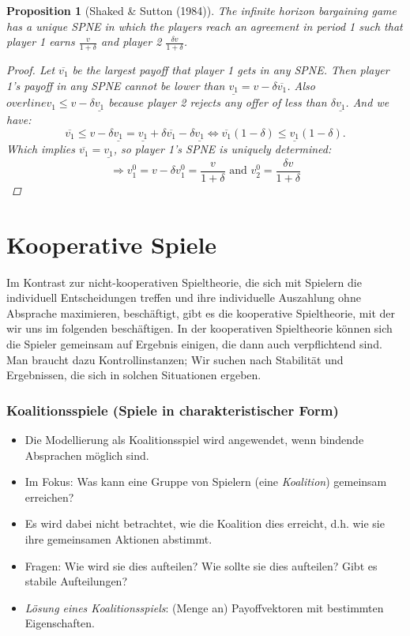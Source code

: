 \documentclass[12pt]{extreport} %
\theoremstyle{named}
\theoremstyle{itshape}
\theoremstyle{normal}
\newtheorem{proposition}[unnamedtheorem]{Proposition}
\begin{document}
\begin{proposition}[Shaked \& Sutton (1984)]
	The infinite horizon bargaining game has a unique SPNE in which the players reach an agreement in period 1 such that player 1 earns $\frac{v}{1 + \delta}$ and player 2 $\frac{\delta v}{1 + \delta}$.
	
	\begin{proof}
		Let $\overline{v_1}$ be the largest payoff that player 1 gets in any SPNE. Then player 1's payoff in any SPNE cannot be lower than $\underline{v_1} = v - \delta \overline{v_1}$. Also $overline{v_1} \leq v - \delta \underline{v_1}$ because player 2 rejects any offer of less than $\delta \underline{v_1}$. And we have:
		$$ \overline{v_1} \leq v - \delta \underline{v_1} = \underline{v_1} + \delta \overline{v_1} - \delta \underline{v_1} \iff \overline{v_1} (1 - \delta) \leq \underline{v_1} (1 - \delta). $$
		Which implies $\overline{v_1} = \underline{v_1}$, so player 1's SPNE is uniquely determined:
		$$ \Rightarrow v_1^0 = v - \delta v_1^0 = \frac{v}{1 + \delta} \text{ and } v_2^0 = \frac{\delta v}{1 + \delta} $$ 
	\end{proof}
\end{proposition}


\chapter{Kooperative Spiele} 


Im Kontrast zur nicht-kooperativen Spieltheorie, die sich mit Spielern die individuell Entscheidungen treffen und ihre individuelle Auszahlung ohne Absprache maximieren, beschäftigt, gibt es die kooperative Spieltheorie, mit der wir uns im folgenden beschäftigen. In der kooperativen Spieltheorie können sich die Spieler gemeinsam auf Ergebnis einigen, die dann auch verpflichtend sind. Man braucht dazu Kontrollinstanzen; Wir suchen nach Stabilität und Ergebnissen, die sich in solchen Situationen ergeben.

\subsection*{Koalitionsspiele (Spiele in charakteristischer Form)}
\begin{itemize}
	\item Die Modellierung als Koalitionsspiel wird angewendet, wenn bindende Absprachen möglich sind. 
	\item Im Fokus: Was kann eine Gruppe von Spielern (eine \textit{Koalition}) gemeinsam erreichen? 
	\item Es wird dabei nicht betrachtet, wie die Koalition dies erreicht, d.h. wie sie ihre gemeinsamen Aktionen abstimmt. 
	\item Fragen: Wie wird sie dies aufteilen? Wie sollte sie dies aufteilen? Gibt es stabile Aufteilungen? 
	\item \textit{Lösung eines Koalitionsspiels}: (Menge an) Payoffvektoren mit bestimmten Eigenschaften.
\end{itemize}
\end{document}
